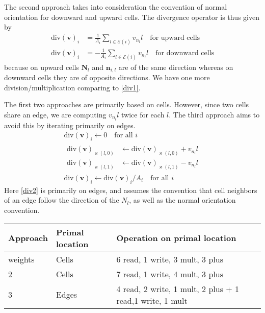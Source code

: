 \documentclass[12pt]{article}
\begin{document}
The second approach takes into consideration the convention of normal orientation for downward and upward cells. The divergence operator is thus given by
\begin{align}
  \text{div}(\bm{v})_i& = \frac{1}{A_i}\sum\limits_{l\in\mathcal{E}(i)}v_{n_l}l \quad \text{for upward cells} \\
  \text{div}(\bm{v})_i& = -\frac{1}{A_i}\sum\limits_{l\in\mathcal{E}(i)}v_{n_l}l \quad \text{for downward cells}
\end{align}
because on upward cells $\bm{N}_l$ and $\bm{n}_{i,l}$ are of the same direction whereas on downward cells they are of opposite directions. We have one more division/multiplication comparing to \cref{div1}.

The first two approaches are primarily based on cells. However, since two cells share an edge, we are computing $v_{n_l}l$ twice for each $l$. The third approach aims to avoid this by iterating primarily on edges.
\begin{gather}
  \text{div}(\bm{v})_i \leftarrow 0 \quad \text{for all }i \\
  \begin{split}
    \label{div2}
    \text{div}(\bm{v})_{\varkappa(l,0)} &\leftarrow \text{div}(\bm{v})_{\varkappa(l,0)} + v_{n_l}l\\
    \text{div}(\bm{v})_{\varkappa(l,1)} &\leftarrow \text{div}(\bm{v})_{\varkappa(l,1)} - v_{n_l}l
  \end{split}\\
  \text{div}(\bm{v})_i \leftarrow \text{div}(\bm{v})_i / A_i \quad \text{for all }i
\end{gather}
Here \cref{div2} is primarily on edges, and assumes the convention that cell neighbors of an edge follow the direction of the $N_l$, as well as the normal orientation convention.

\begin{table}[htbp]
\centering
\begin{tabular}{lll}
\toprule
Approach & Primal location & Operation on primal location\\
\midrule
weights & Cells & 6 read, 1 write, 3 mult, 3 plus\\
2 & Cells & 7 read, 1 write, 4 mult, 3 plus\\
3 & Edges & 4 read, 2 write, 1 mult, 2 plus + 1 read,1 write, 1 mult\\
\bottomrule
\end{tabular}
\end{table}
\end{document}
